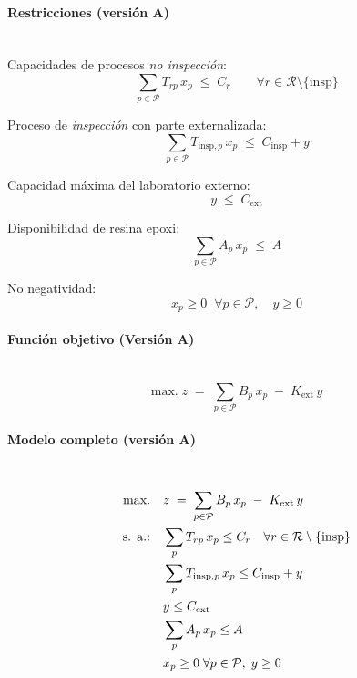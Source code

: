\paragraph{Restricciones (versión A)}\mbox{}\\
Capacidades de procesos \emph{no inspección}:
\begin{equation}
    \sum_{p \in \mathcal{P}} T_{rp}\,x_p \;\le\; C_r \qquad \forall r \in \mathcal{R}\setminus\{\mathrm{insp}\}
\end{equation}

Proceso de \emph{inspección} con parte externalizada:
\begin{equation}
    \sum_{p \in \mathcal{P}} T_{\mathrm{insp},p}\,x_p \;\le\; C_{\mathrm{insp}} + y
\end{equation}

Capacidad máxima del laboratorio externo:
\begin{equation}
    y \;\le\; C_{\mathrm{ext}}
\end{equation}

Disponibilidad de resina epoxi:
\begin{equation}
    \sum_{p \in \mathcal{P}} A_p\,x_p \;\le\; A
\end{equation}

No negatividad:
\begin{equation}
    x_p \ge 0 \;\;\forall p \in \mathcal{P}, \quad y \ge 0
\end{equation}

\paragraph{Función objetivo (Versión A)}\mbox{}\\
\begin{equation}
\mbox{max.}\; z \;=\; \sum_{p \in \mathcal{P}} B_p\,x_p \;-\; K_{\mathrm{ext}}\,y
\end{equation}

\paragraph{Modelo completo (versión A)}\mbox{}\\
\begin{align}
\mbox{max.}\quad & z \;=\; \sum_{p \in \mathcal{P}} B_p\,x_p \;-\; K_{\mathrm{ext}}\,y \notag\\
\mbox{s. a.:}\quad
& \sum_{p} T_{rp}\,x_p \le C_r \quad \forall r \in \mathcal{R}\setminus\{\mathrm{insp}\} \notag\\
& \sum_{p} T_{\mathrm{insp},p}\,x_p \le C_{\mathrm{insp}} + y \notag\\
& y \le C_{\mathrm{ext}} \notag\\
& \sum_{p} A_p\,x_p \le A \notag\\
& x_p \ge 0 \;\forall p \in \mathcal{P},\; y \ge 0 \notag
\end{align}

